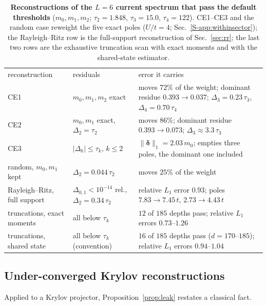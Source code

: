 \documentclass[aps,prb,reprint,onecolumn,12pt,superscriptaddress,longbibliography,floatfix]{revtex4-2}
\begin{document}
\begin{table}[t]
\caption{\label{tab:counter}\textbf{Reconstructions of the $L=6$ current spectrum that pass the default thresholds} ($m_0,m_1,m_2$; $\tau_2=1.848$, $\tau_3=15.0$, $\tau_4=122$). CE1--CE3 and the random case reweight the five exact poles ($U/t=4$; Sec.~\ref{S-app:withinsector}); the Rayleigh--Ritz row is the full-support reconstruction of Sec.~\ref{sec:rr}; the last two rows are the exhaustive truncation scan with exact moments and with the shared-state estimator.}
\small
\begin{ruledtabular}
\begin{tabular}{p{}p{}p{}}
reconstruction & residuals & error it carries \\
\colrule
\raggedright CE1 & \raggedright $m_0,m_1,m_2$ exact & \raggedright moves $72\%$ of the weight; dominant residue $0.393\to0.037$; $\Delta_3=0.23\,\tau_3$, $\Delta_4=0.70\,\tau_4$ \tabularnewline
\raggedright CE2 & \raggedright $m_0,m_1$ exact, $\Delta_2=\tau_2$ & \raggedright moves $86\%$; dominant residue $0.393\to0.073$; $\Delta_3\approx3.3\,\tau_3$ \tabularnewline
\raggedright CE3 & \raggedright $|\Delta_k|\le\tau_k$, $k\le2$ & \raggedright $\|\bm\delta\|_1=2.03\,m_0$; empties three poles, the dominant one included \tabularnewline
\raggedright random, $m_0,m_1$ kept & \raggedright $\Delta_2=0.044\,\tau_2$ & \raggedright moves $25\%$ of the weight \tabularnewline
\raggedright Rayleigh--Ritz, full support & \raggedright $\Delta_{0,1}<10^{-14}$ rel., $\Delta_2=0.34\,\tau_2$ & \raggedright relative $L_1$ error $0.93$; poles $7.83\to7.45\,t$, $2.73\to4.43\,t$ \tabularnewline
\raggedright truncations, exact moments & \raggedright all below $\tau_k$ & \raggedright $12$ of $185$ depths pass; relative $L_1$ errors $0.73$--$1.26$ \tabularnewline
\raggedright truncations, shared state & \raggedright all below $\tau_k$ (convention) & \raggedright $16$ of $185$ depths pass ($d=170$--$185$); relative $L_1$ errors $0.94$--$1.04$ \tabularnewline
\end{tabular}
\end{ruledtabular}
\end{table}

\subsection{Under-converged Krylov reconstructions}
\label{sec:krylov}
Applied to a Krylov projector, Proposition~\ref{prop:leak} restates a classical fact.
\end{document}
